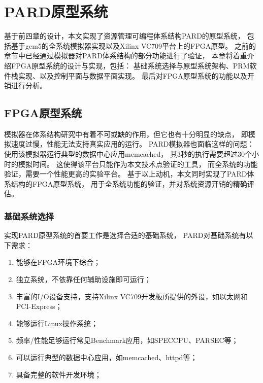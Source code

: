 

\chapter{PARD原型系统}
\label{chap:impl}

基于前四章的设计，本文实现了资源管理可编程体系结构PARD的原型系统，
包括基于gem5的全系统模拟器实现以及Xilinx VC709平台上的FPGA原型。
之前的章节中已经通过模拟器对PARD体系结构的部分功能进行了验证，
本章将着重介绍FPGA原型系统的设计与实现，包括：
基础系统选择与原型系统架构、PRM软件栈实现、以及控制平面与数据平面实现。
最后对FPGA原型系统的功能以及开销进行分析。


\section{FPGA原型系统}

模拟器在体系结构研究中有着不可或缺的作用，但它也有十分明显的缺点，
即模拟速度过慢，性能无法支持真实应用的运行。
PARD模拟器也面临这样的问题：
使用该模拟器运行典型的数据中心应用memcached，
其3秒的执行需要超过30个小时的模拟时间。
这使得该平台只能作为本文技术点验证的工具，
而全系统的功能验证，需要一个性能更高的实验平台。
基于以上动机，本文同时实现了PARD体系结构的FPGA原型系统，
用于全系统功能的验证，并对系统资源开销的精确评估。

\subsection{基础系统选择}

实现PARD原型系统的首要工作是选择合适的基础系统，
PARD对基础系统有以下需求：

\begin{enumerate}[leftmargin=2\parindent, nolistsep, label=\arabic*）]
  \item 能够在FPGA环境下综合；
  \item 独立系统，不依靠任何辅助设施即可运行；
  \item 丰富的I/O设备支持，支持Xilinx VC709开发板所提供的外设，如以太网和PCI-Express；
  \item 能够运行Linux操作系统；
  \item 频率/性能足够运行常见Benchmark应用，如SPECCPU、PARSEC等；
  \item 可以运行典型的数据中心应用，如memcached、httpd等；
  \item 具备完整的软件开发环境；
\end{enumerate}

